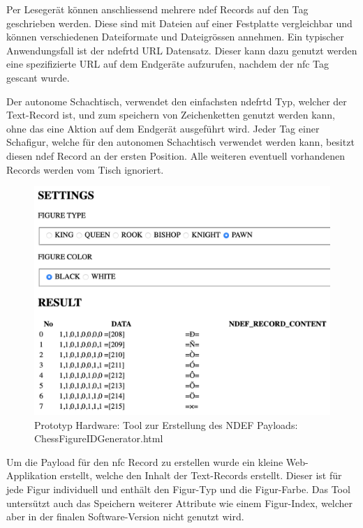 Per Lesegerät können anschliessend mehrere \gls{ndef} Records auf den
Tag geschrieben werden. Diese sind mit Dateien auf einer Festplatte
vergleichbar und können verschiedenen Dateiformate und Dateigrössen
annehmen. Ein typischer Anwendungsfall ist der \gls{ndefrtd} URL
Datensatz. Dieser kann dazu genutzt werden eine spezifizierte URL auf
dem Endgeräte aufzurufen, nachdem der \gls{nfc} Tag gescant
wurde.\cite{nordicnfclibndef}

Der autonome Schachtisch, verwendet den einfachsten \gls{ndefrtd} Typ,
welcher der Text-Record ist, und zum speichern von Zeichenketten genutzt
werden kann, ohne das eine Aktion auf dem Endgerät ausgeführt wird.
Jeder Tag einer Schafigur, welche für den autonomen Schachtisch
verwendet werden kann, besitzt diesen \gls{ndef} Record an der ersten
Position. Alle weiteren eventuell vorhandenen Records werden vom Tisch
ignoriert.\cite{nordicnfclib}

\begin{figure}
\centering
\includegraphics{images/ATC_ChessFigureIDGenerator.png}
\caption{Prototyp Hardware: Tool zur Erstellung des NDEF Payloads:
ChessFigureIDGenerator.html}
\end{figure}

Um die Payload für den \gls{nfc} Record zu erstellen wurde ein kleine
Web-Applikation erstellt, welche den Inhalt der Text-Records erstellt.
Dieser ist für jede Figur individuell und enthält den Figur-Typ und die
Figur-Farbe. Das Tool untersützt auch das Speichern weiterer Attribute
wie einem Figur-Index, welcher aber in der finalen Software-Version
nicht genutzt wird.

